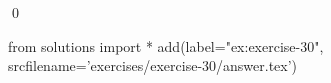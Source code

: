 
\begin{ex} 
  \label{ex:exercise-30}
  
  \qed
\end{ex} 
\begin{python0}
from solutions import *
add(label="ex:exercise-30",
    srcfilename='exercises/exercise-30/answer.tex') 
\end{python0}
